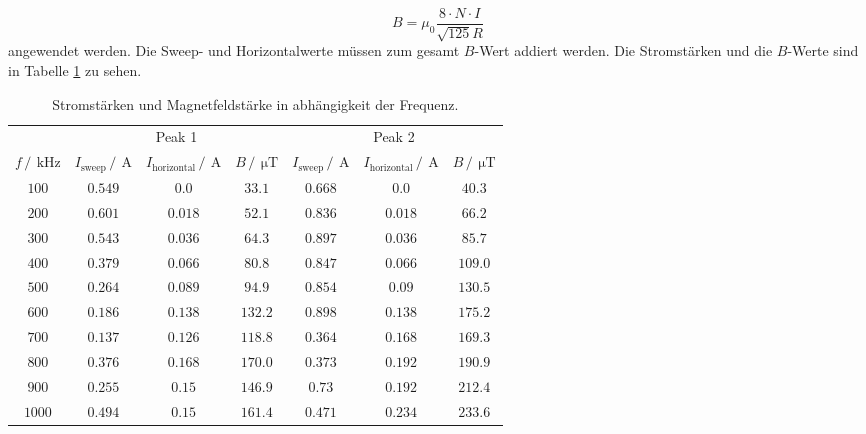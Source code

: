 \begin{equation*}
  B=\mu_0\frac{8\cdot N \cdot I}{\sqrt{125}R}
\end{equation*}
angewendet werden. Die Sweep- und Horizontalwerte müssen zum gesamt $B$-Wert addiert werden. Die Stromstärken und die 
$B$-Werte sind in Tabelle \ref{tab:Messdaten} zu sehen.
\begin{table}
  \centering
  \caption{Stromstärken und Magnetfeldstärke in abhängigkeit der Frequenz.}
  \label{tab:Messdaten}
  \begin{tabular}{c c c c c c c}
    \toprule
    &\multicolumn{3}{c}{Peak 1}&\multicolumn{3}{c}{Peak 2}\\
    \cmidrule(lr){2-4}\cmidrule(lr){5-7}
    $f\,/\,\SI{}{\kilo\hertz}$&$I_{\text{sweep}}\,/\,\SI{}{\ampere}$&$I_{\text{horizontal}}\,/\,\SI{}{\ampere}$&$B\,/\,\SI{}{\micro\tesla}$&$I_{\text{sweep}}\,/\,\SI{}{\ampere}$&$I_{\text{horizontal}}\,/\,\SI{}{\ampere}$&$B\,/\,\SI{}{\micro\tesla}$\\
    \midrule
    $\num{100}$ &$\num{0.549}$&$\num{0.0}$  &$\num{33.1}$&$\num{0.668}$&$\num{0.0}$&$\num{40.3}$\\
    $\num{200}$ &$\num{0.601}$&$\num{0.018}$&$\num{52.1}$&$\num{0.836}$&$\num{0.018}$&$\num{66.2}$\\
    $\num{300}$ &$\num{0.543}$&$\num{0.036}$&$\num{64.3}$&$\num{0.897}$&$\num{0.036}$&$\num{85.7}$\\
    $\num{400}$ &$\num{0.379}$&$\num{0.066}$&$\num{80.8}$&$\num{0.847}$&$\num{0.066}$&$\num{109.0}$\\
    $\num{500}$ &$\num{0.264}$&$\num{0.089}$&$\num{94.9}$&$\num{0.854}$&$\num{0.09}$&$\num{130.5}$\\
    $\num{600}$ &$\num{0.186}$&$\num{0.138}$&$\num{132.2}$&$\num{0.898}$&$\num{0.138}$&$\num{175.2}$\\
    $\num{700}$ &$\num{0.137}$&$\num{0.126}$&$\num{118.8}$&$\num{0.364}$&$\num{0.168}$&$\num{169.3}$\\
    $\num{800}$ &$\num{0.376}$&$\num{0.168}$&$\num{170.0}$&$\num{0.373}$&$\num{0.192}$&$\num{190.9}$\\
    $\num{900}$ &$\num{0.255}$&$\num{0.15}$ &$\num{146.9}$&$\num{0.73}$&$\num{0.192}$&$\num{212.4}$\\
    $\num{1000}$&$\num{0.494}$&$\num{0.15}$ &$\num{161.4}$&$\num{0.471}$&$\num{0.234}$&$\num{233.6}$\\
    \bottomrule
  \end{tabular}
\end{table}